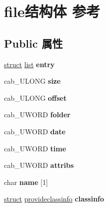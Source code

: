 \hypertarget{structfile}{}\section{file结构体 参考}
\label{structfile}
\subsection*{Public 属性}
\begin{DoxyCompactItemize}
\item 
\mbox{\label{structfile_a4a98dc7eb8acca3bcb2fab977837a862}} 
\hyperlink{interfacestruct}{struct} \hyperlink{classlist}{list} {\bfseries entry}
\item 
\mbox{\label{structfile_a8f7e5b621b7f56d0a9c3494b0cd34f4e}} 
cab\+\_\+\+U\+L\+O\+NG {\bfseries size}
\item 
\mbox{\label{structfile_a175c18801f61b99a3f6660dc9725c557}} 
cab\+\_\+\+U\+L\+O\+NG {\bfseries offset}
\item 
\mbox{\label{structfile_a2af0c43bbcad77d2f90722ceca35f5e3}} 
cab\+\_\+\+U\+W\+O\+RD {\bfseries folder}
\item 
\mbox{\label{structfile_a38f61c8450c178b1dd4cc6acecd1686e}} 
cab\+\_\+\+U\+W\+O\+RD {\bfseries date}
\item 
\mbox{\label{structfile_a9d0885e63ab9b5c1d82cd2df56183fff}} 
cab\+\_\+\+U\+W\+O\+RD {\bfseries time}
\item 
\mbox{\label{structfile_a5f849f4253d949da4199c3f3c02f8f8a}} 
cab\+\_\+\+U\+W\+O\+RD {\bfseries attribs}
\item 
\mbox{\label{structfile_aafbd8cb650169b81de459b5795ab0026}} 
char {\bfseries name} \mbox{[}1\mbox{]}
\item 
\mbox{\label{structfile_abb2fb288ea595134d883bf8faab149fd}} 
\hyperlink{interfacestruct}{struct} \hyperlink{structprovideclassinfo}{provideclassinfo} {\bfseries classinfo}
\item 
\mbox{\label{structfile_aad64e39dc257803abcdfcb59957222cb}} 

\end{DoxyCompactItemize}
